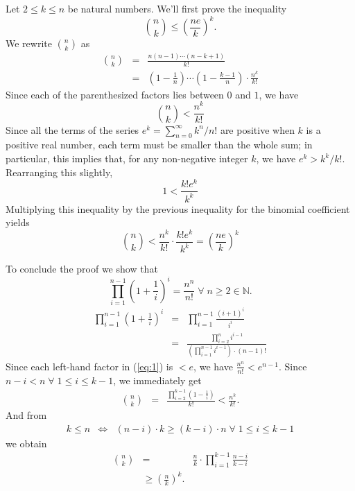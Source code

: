 \documentclass[12pt]{article}
\begin{document}
Let $2 \le k \le n$ be natural numbers. We'll first prove the
inequality
\begin{equation*}
{n \choose k} \le \left(\frac{ne}{k}\right)^k.
\end{equation*}
We rewrite ${n \choose k}$ as
\begin{eqnarray*}
{n \choose k} &=& \frac{n (n-1)\cdots (n-k+1)}{k!} \\
&=& \left(1 -\frac{1}{n}\right)\cdots \left(1
-\frac{k-1}{n}\right)\cdot \frac{n^k}{k!}
\end{eqnarray*}
Since each of the parenthesized factors lies between $0$ and $1$, we have
\begin{equation*}
{n \choose k} < \frac{n^k}{k!}
\end{equation*}
Since all the terms of the series $e^k = \sum_{n=0}^{\infty} k^n / n!$ are positive when $k$ is a positive real number, each term must be smaller than the whole sum; in particular, this implies that, for any non-negative integer $k$, we have $e^k > k^k / k!$.  Rearranging this slightly,
\begin{equation*}
1 < \frac{k! e^k}{k^k}
\end{equation*}
Multiplying this inequality by the previous inequality for the binomial coefficient yields
 \begin{equation*}
{n \choose k} < \frac{n^k}{k!} \cdot \frac{k! e^k}{k^k} = 
\left( \frac{ne}{k} \right)^k
\end{equation*}

To conclude the proof we show that
\begin{equation}
\label{eq:1}
\prod_{i=1}^{n-1} \left(1
+\frac{1}{i}\right)^i=\frac{n^n}{n!}\;\forall\;n \ge 2 \in
\mathbb{N}.
\end{equation}
\begin{eqnarray*}
\prod_{i=1}^{n-1} \left(1+\frac{1}{i}\right)^i&=&\prod_{i=1}^{n-1}
\frac{(i+1)^i}{i^i} \\
&=&\frac{\prod\limits_{i=2}^n i^{i-1}}{\left(\prod\limits_{i=1}^{n-1}
i^{i-1}\right)\cdot (n-1)!}
\end{eqnarray*}
Since each left-hand factor in (\ref{eq:1}) is $<e$, we have
$\frac{n^n}{n!} <e^{n-1}$.
Since $n-i<n\;\forall\;1 \le i \le k-1$, we immediately get
\begin{eqnarray*}
{n \choose k}&=&\frac{\prod\limits_{i=2}^{k-1}
\left(1-\frac{1}{i}\right)}{k!} <\frac{n^k}{k!}.
\end{eqnarray*}
And from
\begin{eqnarray*}
k \le n&\Leftrightarrow&(n-i)\cdot k \ge (k-i)\cdot n\;\forall \;1\le
i\le k-1
\end{eqnarray*}
we obtain
\begin{eqnarray*}
{n \choose k}&=&\frac{n}{k}\cdot \prod\limits_{i=1}^{k-1}
\frac{n-i}{k-i} \\ 
&\ge \left(\frac{n}{k}\right)^k.
\end{eqnarray*}
\end{document}
